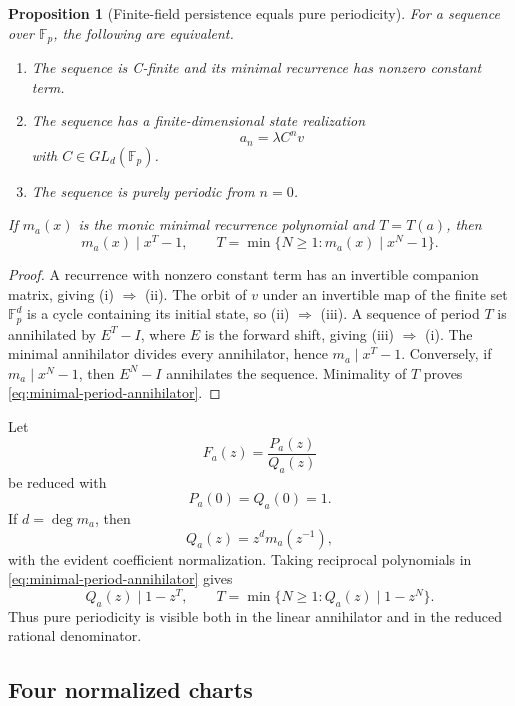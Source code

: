 \documentclass[11pt]{article}
\newtheorem{proposition}[theorem]{Proposition}
\theoremstyle{definition}
\theoremstyle{remark}
\begin{document}
\begin{proposition}[Finite-field persistence equals pure periodicity]
\label{prop:persistent-periodic}
For a sequence over \(\mathbb F_p\), the following are equivalent.
\begin{enumerate}[label=\textup{(\roman*)}]
\item The sequence is C-finite and its minimal recurrence has nonzero constant term.
\item The sequence has a finite-dimensional state realization
\[
a_n=\lambda C^nv
\]
with \(C\in GL_d(\mathbb F_p)\).
\item The sequence is purely periodic from \(n=0\).
\end{enumerate}
If \(m_a(x)\) is the monic minimal recurrence polynomial and \(T=T(a)\), then
\begin{equation}
\label{eq:minimal-period-annihilator}
m_a(x)\mid x^T-1,
\qquad
T=\min\{N\geq 1:m_a(x)\mid x^N-1\}.
\end{equation}
\end{proposition}

\begin{proof}
A recurrence with nonzero constant term has an invertible companion matrix, giving (i) \(\Rightarrow\) (ii).  The orbit of \(v\) under an invertible map of the finite set \(\mathbb F_p^d\) is a cycle containing its initial state, so (ii) \(\Rightarrow\) (iii).  A sequence of period \(T\) is annihilated by \(E^T-I\), where \(E\) is the forward shift, giving (iii) \(\Rightarrow\) (i).  The minimal annihilator divides every annihilator, hence \(m_a\mid x^T-1\).  Conversely, if \(m_a\mid x^N-1\), then \(E^N-I\) annihilates the sequence.  Minimality of \(T\) proves \cref{eq:minimal-period-annihilator}.
\end{proof}

Let
\[
F_a(z)=\frac{P_a(z)}{Q_a(z)}
\]
be reduced with
\[
P_a(0)=Q_a(0)=1.
\]
If \(d=\deg m_a\), then
\[
Q_a(z)=z^dm_a(z^{-1}),
\]
with the evident coefficient normalization.  Taking reciprocal polynomials in \cref{eq:minimal-period-annihilator} gives
\begin{equation}
\label{eq:minimal-period-denominator}
Q_a(z)\mid 1-z^T,
\qquad
T=\min\{N\geq 1:Q_a(z)\mid 1-z^N\}.
\end{equation}
Thus pure periodicity is visible both in the linear annihilator and in the reduced rational denominator.

\subsection{Four normalized charts}
\end{document}
